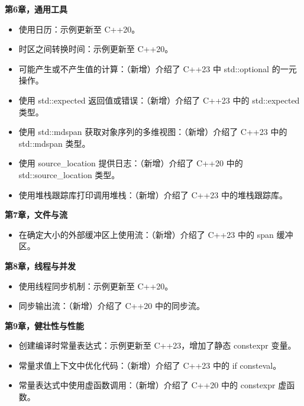 \textbf{第6章，通用工具}

\begin{itemize}
\item
使用日历：示例更新至 C++20。

\item
时区之间转换时间：示例更新至 C++20。

\item
可能产生或不产生值的计算：（新增）介绍了 C++23 中 std::optional 的一元操作。

\item
使用 std::expected 返回值或错误：（新增）介绍了 C++23 中的 std::expected 类型。

\item
使用 std::mdspan 获取对象序列的多维视图：（新增）介绍了 C++23 中的 std::mdspan 类型。

\item
使用 source\_location 提供日志：（新增）介绍了 C++20 中的 std::source\_location 类型。

\item
使用堆栈跟踪库打印调用堆栈：（新增）介绍了 C++23 中的堆栈跟踪库。
\end{itemize}

\textbf{第7章，文件与流}

\begin{itemize}
\item
在确定大小的外部缓冲区上使用流：（新增）介绍了 C++23 中的 span 缓冲区。
\end{itemize}

\textbf{第8章，线程与并发}

\begin{itemize}
\item
使用线程同步机制：示例更新至 C++20。

\item
同步输出流：（新增）介绍了 C++20 中的同步流。
\end{itemize}

\textbf{第9章，健壮性与性能}

\begin{itemize}
\item
创建编译时常量表达式：示例更新至 C++23，增加了静态 constexpr 变量。

\item
常量求值上下文中优化代码：（新增）介绍了 C++23 中的 if consteval。

\item
常量表达式中使用虚函数调用：（新增）介绍了 C++20 中的 constexpr 虚函数。
\end{itemize}

